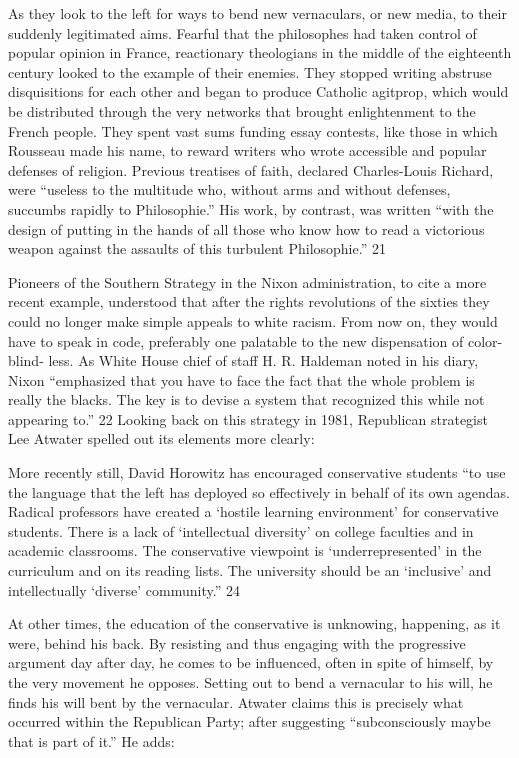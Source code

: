  \par 
As they look to the left for ways to bend new vernaculars, or new media, to their suddenly legitimated aims. Fearful that the philosophes had taken control of popular opinion in France, reactionary theologians in the middle of the eighteenth century looked to the example of their enemies. They stopped writing abstruse disquisitions for each other and began to produce Catholic agitprop, which would be distributed through the very networks that brought enlightenment to the French people. They spent vast sums funding essay contests, like those in which Rousseau made his name, to reward writers who wrote accessible and popular defenses of religion. Previous treatises of faith, declared Charles-Louis Richard, were “useless to the multitude who, without arms and without defenses, succumbs rapidly to Philosophie.” His work, by contrast, was written “with the design of putting in the hands of all those who know how to read a victorious weapon against the assaults of this turbulent Philosophie.” 21
 \par 
Pioneers of the Southern Strategy in the Nixon administration, to cite a more recent example, understood that after the rights revolutions of the sixties they could no longer make simple appeals to white racism. From now on, they would have to speak in code, preferably one palatable to the new dispensation of color-blind- less. As White House chief of staff H. R. Haldeman noted in his diary, Nixon “emphasized that you have to face the fact that the whole problem is really the blacks. The key is to devise a system that recognized this while not appearing to.” 22 Looking back on this strategy in 1981, Republican strategist Lee Atwater spelled out its elements more clearly:
 \par 
More recently still, David Horowitz has encouraged conservative students “to use the language that the left has deployed so effectively in behalf of its own agendas. Radical professors have created a ‘hostile learning environment’ for conservative students. There is a lack of ‘intellectual diversity’ on college faculties and in academic classrooms. The conservative viewpoint is ‘underrepresented’ in the curriculum and on its reading lists. The university should be an ‘inclusive’ and intellectually ‘diverse’ community.” 24
 \par 
At other times, the education of the conservative is unknowing, happening, as it were, behind his back. By resisting and thus engaging with the progressive argument day after day, he comes to be influenced, often in spite of himself, by the very movement he opposes. Setting out to bend a vernacular to his will, he finds his will bent by the vernacular. Atwater claims this is precisely what occurred within the Republican Party; after suggesting “subconsciously maybe that is part of it.” He adds:

